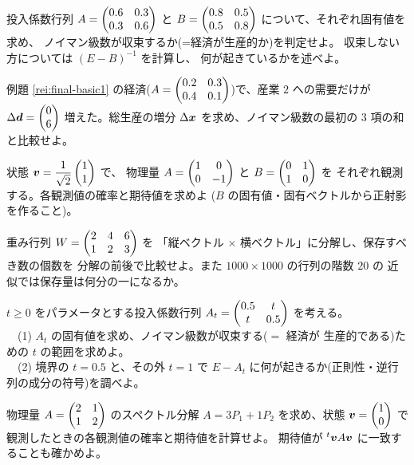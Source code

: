 \begin{mondai}[基本]\label{q:final-ex4}
投入係数行列 $A = \begin{pmatrix}0.6 & 0.3 \\ 0.3 & 0.6\end{pmatrix}$ と
$B = \begin{pmatrix}0.8 & 0.5 \\ 0.5 & 0.8\end{pmatrix}$ について、それぞれ固有値を求め、
ノイマン級数が収束するか(=経済が生産的か)を判定せよ。
収束しない方については $(E - B)^{-1}$ を計算し、
何が起きているかを述べよ。
\end{mondai}

\begin{mondai}[標準]\label{q:final-ex5}
例題 \ref{rei:final-basic1} の経済($A = \begin{pmatrix}0.2 & 0.3 \\
0.4 & 0.1\end{pmatrix}$)で、産業 $2$ への需要だけが
$\Delta\bm{d} = \begin{pmatrix}0 \\ 6\end{pmatrix}$ 増えた。総生産の増分
$\Delta\bm{x}$ を求め、ノイマン級数の最初の $3$ 項の和と比較せよ。
\end{mondai}

\begin{mondai}[標準]\label{q:final-ex6}
状態 $\bm{v} = \dfrac{1}{\sqrt{2}}\begin{pmatrix}1 \\ 1\end{pmatrix}$ で、
物理量 $A = \begin{pmatrix}1 & 0 \\ 0 & -1\end{pmatrix}$ と $B = \begin{pmatrix}0 & 1 \\ 1 & 0\end{pmatrix}$ を
それぞれ観測する。各観測値の確率と期待値を求めよ
($B$ の固有値・固有ベクトルから正射影を作ること)。
\end{mondai}

\begin{mondai}[標準]\label{q:final-ex7}
重み行列 $W = \begin{pmatrix}2 & 4 & 6 \\ 1 & 2 & 3\end{pmatrix}$ を
「縦ベクトル $\times$ 横ベクトル」に分解し、保存すべき数の個数を
分解の前後で比較せよ。また $1000 \times 1000$ の行列の階数 $20$ の
近似では保存量は何分の一になるか。
\end{mondai}

\begin{mondai}[発展]\label{q:final-ex8}
$t \ge 0$ をパラメータとする投入係数行列
$A_t = \begin{pmatrix}0.5 & t \\ t & 0.5\end{pmatrix}$ を考える。\\
　(1) $A_t$ の固有値を求め、ノイマン級数が収束する($=$ 経済が
生産的である)ための $t$ の範囲を求めよ。\\
　(2) 境界の $t = 0.5$ と、その外 $t = 1$ で
$E - A_t$ に何が起きるか(正則性・逆行列の成分の符号)を調べよ。
\end{mondai}

\begin{mondai}[発展]\label{q:final-ex9}
物理量 $A = \begin{pmatrix}2 & 1 \\ 1 & 2\end{pmatrix}$ のスペクトル分解
$A = 3P_1 + 1P_2$ を求め、状態 $\bm{v} = \begin{pmatrix}1 \\ 0\end{pmatrix}$ で
観測したときの各観測値の確率と期待値を計算せよ。
期待値が ${}^t\bm{v}A\bm{v}$ に一致することも確かめよ。
\end{mondai}

